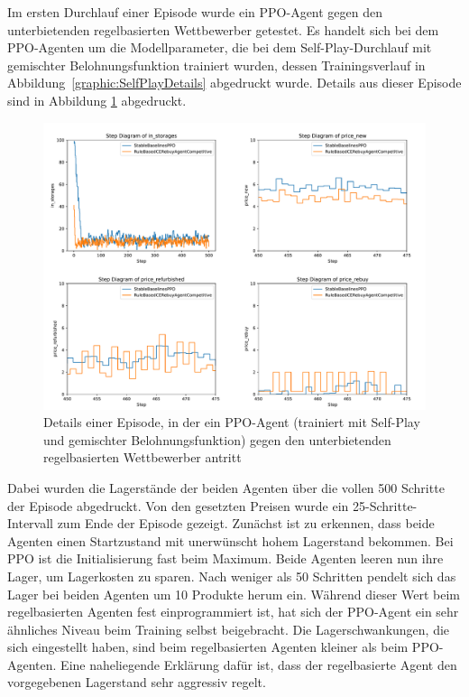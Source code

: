 Im ersten Durchlauf einer Episode wurde ein PPO-Agent gegen den unterbietenden regelbasierten Wettbewerber getestet.
Es handelt sich bei dem PPO-Agenten um die Modellparameter, die bei dem Self-Play-Durchlauf mit gemischter Belohnungsfunktion trainiert wurden, dessen Trainingsverlauf in \mbox{Abbildung \ref{graphic:SelfPlayDetails}} abgedruckt wurde.
Details aus dieser Episode sind in Abbildung \ref{graphic:EpisodeAnalysisPPOvsRulebased} abgedruckt.
\begin{figure}[htb]
	\centering
	\includegraphics[width=\textwidth]{main/episode_analysis_ppo_vs_rulebased.pdf}
	\caption{Details einer Episode, in der ein PPO-Agent (trainiert mit Self-Play und gemischter Belohnungsfunktion) gegen den unterbietenden regelbasierten Wettbewerber antritt}
	\label{graphic:EpisodeAnalysisPPOvsRulebased}
\end{figure}
Dabei wurden die Lagerstände der beiden Agenten über die vollen 500 Schritte der Episode abgedruckt.
Von den gesetzten Preisen wurde ein 25-Schritte-Intervall zum Ende der Episode gezeigt.
Zunächst ist zu erkennen, dass beide Agenten einen Startzustand mit unerwünscht hohem Lagerstand bekommen.
Bei PPO ist die Initialisierung fast beim Maximum.
Beide Agenten leeren nun ihre Lager, um Lagerkosten zu sparen.
Nach weniger als 50 Schritten pendelt sich das Lager bei beiden Agenten um 10 Produkte herum ein.
Während dieser Wert beim regelbasierten Agenten fest einprogrammiert ist, hat sich der PPO-Agent ein sehr ähnliches Niveau beim Training selbst beigebracht.
Die Lagerschwankungen, die sich eingestellt haben, sind beim regelbasierten Agenten kleiner als beim PPO-Agenten.
Eine naheliegende Erklärung dafür ist, dass der regelbasierte Agent den vorgegebenen Lagerstand sehr aggressiv regelt.
